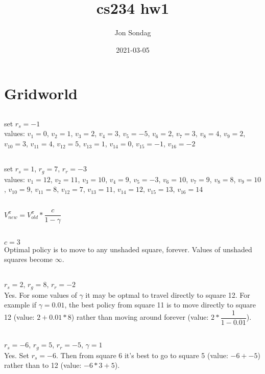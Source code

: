 \documentclass[10pt,a4paper]{article}
\title{cs234 hw1}
\date{2021-03-05}
\author{Jon Sondag}
\begin{document}
  \maketitle
  \section{Gridworld}
  \subsection{}
  set $r_s = -1$ \\
  values:
  $v_1 = 0$,
  $v_2 = 1$,
  $v_3 = 2$,
  $v_4 = 3$,
  $v_5 = -5$,
  $v_6 = 2$,
  $v_7 = 3$,
  $v_8 = 4$,
  $v_9 = 2$,
  $v_{10} = 3$,
  $v_{11} = 4$,
  $v_{12} = 5$,
  $v_{13} = 1$,
  $v_{14} = 0$,
  $v_{15} = -1$,
  $v_{16} = -2$
  \subsection{}
  set $r_s = 1$, $r_g = 7$, $r_r = -3$ \\
  values:
  $v_1 = 12$,
  $v_2 = 11$,
  $v_3 = 10$,
  $v_4 = 9$,
  $v_5 = -3$,
  $v_6 = 10$,
  $v_7 = 9$,
  $v_8 = 8$,
  $v_9 = 10$,
  $v_{10} = 9$,
  $v_{11} = 8$,
  $v_{12} = 7$,
  $v_{13} = 11$,
  $v_{14} = 12$,
  $v_{15} = 13$,
  $v_{16} = 14$
  \subsection{}
  $V_{new}^{\pi} = V_{old}^{\pi} * \dfrac{c}{1 - \gamma}$
  \subsection{}
  $c = 3$ \\
  Optimal policy is to move to any unshaded square, forever.  Values of unshaded squares become $\infty$.
  \subsection{}
  $r_s = 2$, $r_g = 8$, $r_r = -2$ \\
  Yes.  For some values of $\gamma$ it may be optmal to travel directly to square 12.  For example if $\gamma = 0.01$, the best policy from square 11 is to move directly to square 12 (value: $2 + 0.01 * 8$) rather than moving around forever (value: $2 * \dfrac{1}{1-0.01}$).
  \subsection{}
  $r_s = -6$, $r_g = 5$, $r_r = -5$, $\gamma=1$ \\
  Yes.  Set $r_s = -6$. Then from square 6 it's best to go to square 5 (value: $-6 + -5$) rather than to 12 (value: $-6*3 + 5$).
\end{document}
